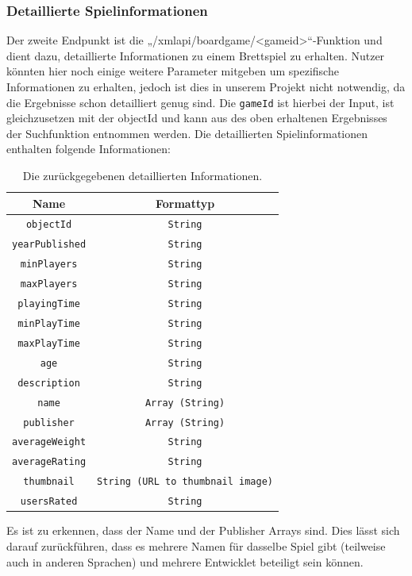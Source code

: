 \subsubsection{Detaillierte Spielinformationen}
Der zweite Endpunkt ist die „/xmlapi/boardgame/<gameid>“-Funktion und dient dazu,
detaillierte Informationen zu einem Brettspiel zu erhalten. Nutzer könnten hier noch einige weitere Parameter mitgeben um spezifische Informationen zu erhalten, jedoch ist dies in unserem Projekt nicht notwendig, da die Ergebnisse schon detailliert genug sind.
Die \texttt{gameId} ist hierbei der Input, ist gleichzusetzen mit der objectId und kann aus des oben erhaltenen Ergebnisses der Suchfunktion entnommen werden.
Die detaillierten Spielinformationen enthalten folgende Informationen:
\begin{table}[H]
    \centering
    \begin{tabular}{|c|c|}
        \hline
        \textbf{Name} & \textbf{Formattyp} \\
        \hline
        \texttt{objectId} & \texttt{String} \\
        \texttt{yearPublished} & \texttt{String} \\
        \texttt{minPlayers} & \texttt{String} \\
        \texttt{maxPlayers} & \texttt{String} \\
        \texttt{playingTime} & \texttt{String} \\
        \texttt{minPlayTime} & \texttt{String} \\
        \texttt{maxPlayTime} & \texttt{String} \\
        \texttt{age} & \texttt{String} \\
        \texttt{description} & \texttt{String} \\
        \texttt{name} & \texttt{Array (String)} \\
        \texttt{publisher} & \texttt{Array (String)} \\
        \texttt{averageWeight} & \texttt{String} \\
        \texttt{averageRating} & \texttt{String} \\
        \texttt{thumbnail} & \texttt{String (URL to thumbnail image)} \\
        \texttt{usersRated} & \texttt{String} \\
        \hline
    \end{tabular}
    \caption{Die zurückgegebenen detaillierten Informationen.}
    \label{tab:boardgame_properties}
\end{table}
Es ist zu erkennen, dass der Name und der Publisher Arrays sind. Dies lässt sich darauf zurückführen, dass es mehrere Namen für dasselbe Spiel gibt (teilweise auch in anderen Sprachen) und mehrere Entwicklet beteiligt sein können.
